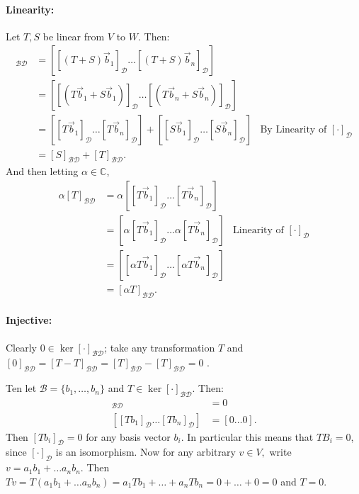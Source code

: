 \documentclass{article}
\begin{document}
\begin{enumerate}
\begin{enumerate}
          \paragraph{Linearity: }Let $T,S$ be linear from $V$ to $W$. Then:
          \begin{align*}
              [T+S]_{\mathcal{B}\mathcal{D}}&= \left[ [(T+S)\vec{b}_1]_\mathcal{D} \ldots [(T+S)\vec{b}_n]_\mathcal{D}  \right] \\
               &= \left[ [(T\vec{b}_1+S\vec{b}_1)]_\mathcal{D} \ldots [(T\vec{b}_n+S\vec{b}_n)]_\mathcal{D}  \right]\\
               &= \left[ [T\vec{b}_1]_\mathcal{D}\ldots [T\vec{b}_n]_\mathcal{D} \right] + \left[ [S\vec{b}_1]_\mathcal{D}\ldots [S\vec{b}_n]_\mathcal{D} \right] &\text{By Linearity of }[\cdot]_\mathcal{D}\\
               &=  [S]_{\mathcal{B}\mathcal{D}} +[T]_{\mathcal{B}\mathcal{D}} 
          .\end{align*}
          And then letting $\alpha\in \mathbb{C}$,
           \begin{align*}
               \alpha[T]_{\mathcal{B}\mathcal{D}}&=\alpha\left[ [T\vec{b}_1]_\mathcal{D}\ldots[T\vec{b}_n]_\mathcal{D} \right] \\
                         &=\left[ \alpha[T\vec{b}_1]_\mathcal{D} \ldots\alpha[T\vec{b}_n]_\mathcal{D}  \right]&\text{Linearity of }[\cdot]_\mathcal{D}\\
                         &=\left[ [\alpha T\vec{b}_1]_\mathcal{D} \ldots[\alpha T\vec{b}_n]_\mathcal{D} \right] \\
               &= [\alpha T]_{\mathcal{B}\mathcal{D}} 
          .\end{align*}
          \paragraph{Injective: } 
          Clearly  $0\in \ker[\cdot ]_{\mathcal{BD}}$; take any transformation $T$ and $[0]_{\mathcal{BD}}=[T-T]_{\mathcal{BD}}=[T]_{\mathcal{BD}}-[T]_{\mathcal{BD}}=0$ .

      Ten let $\mathcal{B}=\{b_1,\ldots ,b_n\} $ and $T\in \ker [\cdot ]_\mathcal{BD} $. Then:
      \begin{align*}
          [T]_{\mathcal{BD}}&=0\\
          \left[ [Tb_1]_\mathcal{D}\ldots [Tb_n]_\mathcal{D}\right] &=[0\ldots 0]
      .\end{align*} 
      Then $[Tb_i]_{\mathcal{D}}=0$ for any basis vector $b_i$. In particular this means that $TB_i=0$, since $[\cdot ]_\mathcal{D}$ is an isomorphism. Now for any arbitrary $v\in V,$ write $v=a_1b_1+\ldots a_nb_n$. Then $Tv=T(a_1b_1+\ldots a_n b_n)=a_1Tb_1+\ldots+a_nTb_n=0+\ldots+0=0$ and $T=0$.


\end{enumerate}
\end{enumerate}
\end{document}

